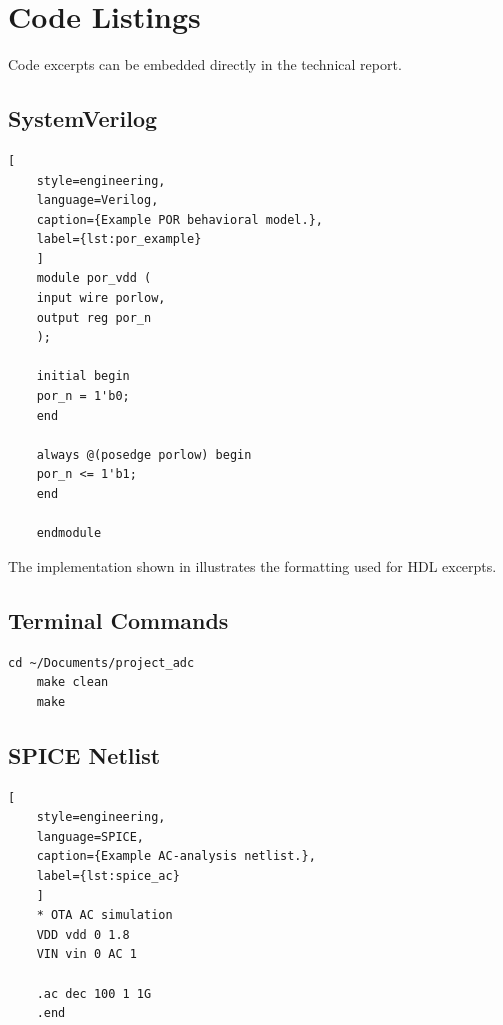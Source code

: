 
\section{Code Listings}

Code excerpts can be embedded directly in the technical report.

\subsection{SystemVerilog}

\begin{lstlisting}[
	style=engineering,
	language=Verilog,
	caption={Example POR behavioral model.},
	label={lst:por_example}
	]
	module por_vdd (
	input wire porlow,
	output reg por_n
	);
	
	initial begin
	por_n = 1'b0;
	end
	
	always @(posedge porlow) begin
	por_n <= 1'b1;
	end
	
	endmodule
\end{lstlisting}

The implementation shown in 
illustrates the formatting used for HDL excerpts.

\subsection{Terminal Commands}

\begin{lstlisting}[style=terminal]
	cd ~/Documents/project_adc
	make clean
	make
\end{lstlisting}

\subsection{SPICE Netlist}

\begin{lstlisting}[
	style=engineering,
	language=SPICE,
	caption={Example AC-analysis netlist.},
	label={lst:spice_ac}
	]
	* OTA AC simulation
	VDD vdd 0 1.8
	VIN vin 0 AC 1
	
	.ac dec 100 1 1G
	.end
\end{lstlisting}